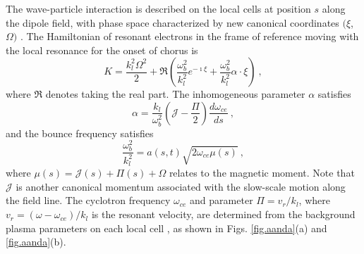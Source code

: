 The wave-particle interaction is described on the local cells 
at position $s$ along the dipole field, with phase space characterized by new canonical coordinates $(\xi$, $\Omega)$
\cite{zheng2024}.
The Hamiltonian of resonant electrons in the frame of reference moving with the local resonance for the onset of chorus is 
\cite{zheng2024}
\begin{equation}\label{eq.H_lab}
    K = \frac{k_l^2\Omega^2}{2} + {\Re}\left(\frac{\omega_b^2}{k_l^2} e^{-\imath \xi} + \frac{\omega_b^2}{k_l^2}\alpha \cdot \xi \right)~,
\end{equation}
where ${\Re}$ denotes taking the real part.
The inhomogeneous parameter $\alpha$ satisfies
\begin{equation}\label{eq.alpold}
   \alpha  = \frac{k_l}{\omega_{b}^2}(\mathcal{J} - \frac{\Pi}{2}) \frac{d\omega_{ce}}{ds}~,
\end{equation}
and the bounce frequency satisfies
\begin{equation}
    \frac{\omega_b^2}{k_l^2} =  a(s,t) \sqrt{2\omega_{ce}\mu(s)}~,
\end{equation}
where $\mu(s) = \mathcal{J}(s)+\Pi(s)+\Omega$
relates to 
the magnetic moment.
Note that $\mathcal{J}$ is another canonical momentum associated with the slow-scale motion along the field line. The cyclotron frequency $\omega_{ce}$
and parameter $\Pi = v_r/k_l$, where $v_r=(\omega - \omega_{ce})/k_l$ is the resonant velocity,
are determined from the background plasma parameters on each local cell \cite{zheng2024,zheng2023b}, 
as shown in Figs. \ref{fig.aanda}(a) and \ref{fig.aanda}(b).
